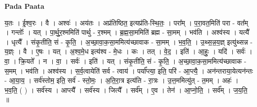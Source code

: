 \documentclass[17pt]{extarticle}
\begin{document}
\textbf{Pada Paata} \newline

य॒तः । ई॒श्व॒रः । वै । अश्वः॑ । अय॑तः । अप्र॑तिष्ठित॒ इत्यप्र॑ति-स्थि॒तः॒ । परा᳚म् । प॒रा॒वत॒मिति॑ परा - वत᳚म् । गन्तोः᳚ । यत् । पा॒र्थु॒र॒श्ममिति॑ पार्थु - र॒श्मम् । ब्र॒ह्म॒सा॒ममिति॑ ब्रह्म - सा॒मम् । भव॑ति । अश्व॑स्य । यत्यै᳚ । धृत्यै᳚ । संकृ॒तीति॒ सं - कृ॒ति॒ । अ॒च्छा॒वा॒क॒सा॒ममित्य॑च्छावाक - सा॒मम् । भ॒व॒ति॒ । उ॒थ्स॒न्न॒य॒ज्ञ् इत्यु॑थ्सन्न - य॒ज्ञ्ः । वै । ए॒षः । यत् । अ॒श्व॒मे॒ध इत्य॑श्व - मे॒धः । कः । तत् । वे॒द॒ । इति॑ । आ॒हुः॒ । यदि॑ । सर्वः॑ । वा॒ । क्रि॒यते᳚ । न । वा॒ । सर्वः॑ । इति॑ । यत् । संकृ॒तीति॒ सं - कृ॒ति॒ । अ॒च्छा॒वा॒क॒सा॒ममित्य॑च्छावाक - स॒मम् । भव॑ति । अश्व॑स्य । स॒र्व॒त्वायेति॑ सर्व - त्वाय॑ । पर्या᳚प्त्या॒ इति॒ परि॑ - आ॒प्त्यै॒ । अन॑न्तराया॒येत्यन॑न्तः - आ॒या॒य॒ । सर्व॑स्तोम॒ इति॒ सर्व॑ - स्तो॒मः॒ । अ॒ति॒रा॒त्र इत्य॑ति - रा॒त्रः । उ॒त्त॒ममित्यु॑त् - त॒मम् । अहः॑ । भ॒व॒ति॒ ( ) । सर्व॑स्य । आप्त्यै᳚ । सर्व॑स्य । जित्यै᳚ । सर्व᳚म् । ए॒व । तेन॑ । आ॒प्नो॒ति॒ । सर्व᳚म् । ज॒य॒ति॒ ॥  \newline
\end{document}
